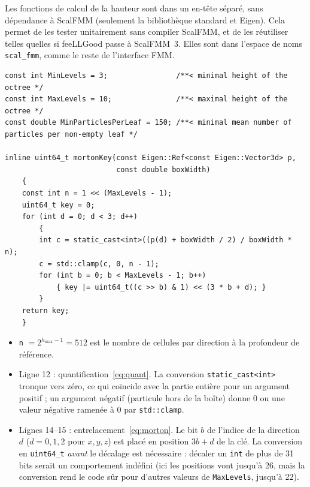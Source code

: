 \documentclass[11pt,a4paper]{article}
\newcommand{\code}[1]{\texttt{#1}}
\begin{document}
Les fonctions de calcul de la hauteur sont dans un en-tête séparé, sans dépendance à ScalFMM
(seulement la bibliothèque standard et Eigen). Cela permet de les tester unitairement sans
compiler ScalFMM, et de les réutiliser telles quelles si feeLLGood passe à ScalFMM~3. Elles sont
dans l'espace de noms \code{scal\_fmm}, comme le reste de l'interface FMM.

\begin{lstlisting}[caption={Constantes et clé de Morton (\code{src/octree\_height.h}).}]
const int MinLevels = 3;                /**< minimal height of the octree */
const int MaxLevels = 10;               /**< maximal height of the octree */
const double MinParticlesPerLeaf = 150; /**< minimal mean number of particles per non-empty leaf */

inline uint64_t mortonKey(const Eigen::Ref<const Eigen::Vector3d> p,
                          const double boxWidth)
    {
    const int n = 1 << (MaxLevels - 1);
    uint64_t key = 0;
    for (int d = 0; d < 3; d++)
        {
        int c = static_cast<int>((p(d) + boxWidth / 2) / boxWidth * n);
        c = std::clamp(c, 0, n - 1);
        for (int b = 0; b < MaxLevels - 1; b++)
            { key |= uint64_t((c >> b) & 1) << (3 * b + d); }
        }
    return key;
    }
\end{lstlisting}

\begin{itemize}
  \item \code{n} $= 2^{h_{\max}-1} = 512$ est le nombre de cellules par direction à la profondeur
        de référence.
  \item Ligne 12 : quantification~\eqref{eq:quant}. La conversion \code{static\_cast<int>}
        tronque vers zéro, ce qui coïncide avec la partie entière pour un argument positif ; un
        argument négatif (particule hors de la boîte) donne $0$ ou une valeur négative ramenée à
        $0$ par \code{std::clamp}.
  \item Lignes 14--15 : entrelacement~\eqref{eq:morton}. Le bit $b$ de l'indice de la direction
        $d$ ($d = 0, 1, 2$ pour $x, y, z$) est placé en position $3b + d$ de la clé. La
        conversion en \code{uint64\_t} \emph{avant} le décalage est nécessaire : décaler un
        \code{int} de plus de 31 bits serait un comportement indéfini (ici les positions vont
        jusqu'à 26, mais la conversion rend le code sûr pour d'autres valeurs de
        \code{MaxLevels}, jusqu'à 22).
\end{itemize}
\end{document}
